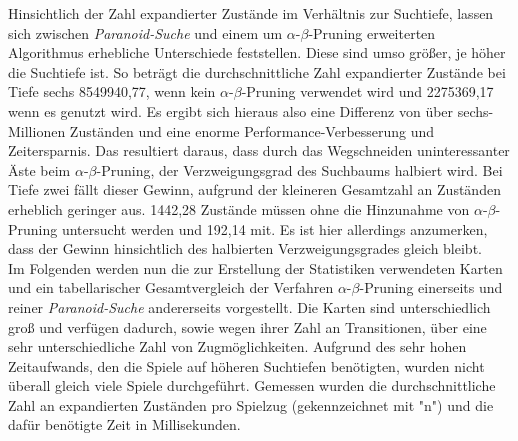 \documentclass[12pt,a4paper,bibliography=totocnumbered,listof=totocnumbered,ngerman]{scrartcl}
\begin{document}
Hinsichtlich der Zahl expandierter Zustände im Verhältnis zur Suchtiefe, lassen sich zwischen \emph{Paranoid-Suche} und einem um $\alpha$-$\beta$-Pruning erweiterten Algorithmus erhebliche Unterschiede feststellen. 
Diese sind umso größer, je höher die Suchtiefe ist. So beträgt die durchschnittliche Zahl expandierter Zustände bei Tiefe sechs 8549940,77, wenn kein $\alpha$-$\beta$-Pruning verwendet wird und 2275369,17 wenn es genutzt wird. 
Es ergibt sich hieraus also eine Differenz von über sechs-Millionen Zuständen und eine enorme Performance-Verbesserung und Zeitersparnis. 
Das resultiert daraus, dass durch das Wegschneiden uninteressanter Äste beim $\alpha$-$\beta$-Pruning, der Verzweigungsgrad des Suchbaums halbiert wird.
Bei Tiefe zwei fällt dieser Gewinn, aufgrund der kleineren Gesamtzahl an Zuständen erheblich geringer aus. 1442,28 Zustände müssen ohne die Hinzunahme von $\alpha$-$\beta$-Pruning untersucht werden und 192,14 mit. Es ist hier allerdings anzumerken, dass der Gewinn hinsichtlich des halbierten Verzweigungsgrades gleich bleibt.\\

Im Folgenden werden nun die zur Erstellung der Statistiken verwendeten Karten und ein tabellarischer Gesamtvergleich der Verfahren $\alpha$-$\beta$-Pruning einerseits und reiner \emph{Paranoid-Suche} andererseits vorgestellt. Die Karten sind unterschiedlich groß und verfügen dadurch, sowie wegen ihrer Zahl an Transitionen, über eine sehr unterschiedliche Zahl von Zugmöglichkeiten. Aufgrund des sehr hohen Zeitaufwands, den die Spiele auf höheren Suchtiefen benötigten, wurden nicht überall gleich viele Spiele durchgeführt. Gemessen wurden die durchschnittliche Zahl an expandierten Zuständen pro Spielzug (gekennzeichnet mit "n") und die dafür benötigte Zeit in Millisekunden.\\

\vspace{1em}
\end{document}
